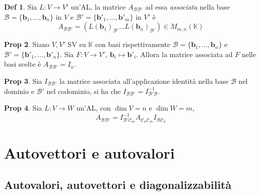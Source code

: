\documentclass[]{article}
\newcommand{\vb}{\mathbf{b}}
\theoremstyle{definition}
\theoremstyle{definition}
\newtheorem{prop}{Prop}[subsection]
\theoremstyle{definition}
\newtheorem{dfn}[prop]{Def}
\begin{document}
\begin{dfn} Sia $L: V \to V'$ un'AL, la matrice $A_{\mathcal{BB'}}$ ad essa \emph{associata} nella base $\mathcal{B}=\{ \vb _1 , ..., \vb _n \}$ in $V$ e $\mathcal{B'}=\{ \vb ' _1 , ..., \vb ' _m \}$ in $V'$ è 
$$
A_{\mathcal{BB'}} = \left(L( \vb _1 )_\mathcal{B'} ... L( \vb _n )_\mathcal{B'}\right) \in M_{m,n}(\mathbb{K}) 
$$

\end{dfn} \begin{prop} Siano $V,V'$ SV su $\mathbb{K}$ con basi rispettivamente $\mathcal{B}=\{ \vb _1 , ..., \vb _n \}$ e $\mathcal{B'}=\{ \vb ' _1 , ..., \vb ' _n \}$. Sia $F: V \to V',\ \vb_i \mapsto \vb '_i$. Allora la matrice associata ad $F$ nelle basi scelte è $A_{\mathcal{BB'}}=I_n$.

\end{prop} \begin{prop} Sia $I_{\mathcal{BB'}}$ la matrice associata all'applicazione identità nella base ${\mathcal{B}}$ nel dominio e ${\mathcal{B'}}$ nel codominio, si ha che $I_{\mathcal{BB'}}=I_{\mathcal{B'B}} ^{-1}$.

\end{prop} \begin{prop} Sia $L: V \to W $ un'AL, con $\dim V = n$ e $\dim W = m$, 
$$A_{\mathcal{BB'}}=I_{\mathcal{B'C}_m} ^{-1} A_{\mathcal{C}_n \mathcal{C}_m} I_{\mathcal{BC}_n}$$
\end{prop}

\section{Autovettori e autovalori} 
\subsection{Autovalori, autovettori e diagonalizzabilità}
\end{document}
